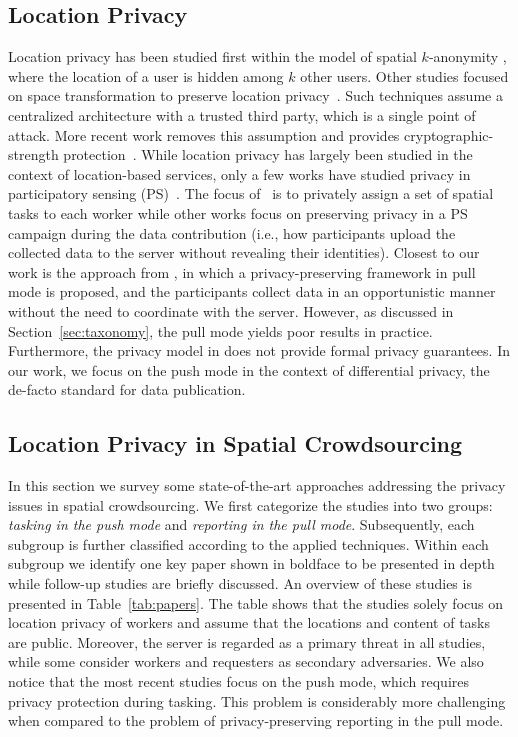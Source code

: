 \documentclass{USC-Thesis}
\numberwithin{equation}{chapter}
\begin{document}
\subsection{Location Privacy}
Location privacy has been studied first within the model of spatial $k$-anonymity \cite{gruteser2003anonymous,kido2005anonymous,mca06,gedik2008protecting,xue2009location,dewri2010query,palanisamy2011mobimix}, where the location of a user is hidden among $k$ other users. Other studies focused on space transformation to preserve location privacy~\cite{khoshgozaran2007blind,yiu2008spacetwist}.
Such techniques assume a centralized architecture with a trusted third party, which is a single point of attack. More recent work removes this assumption and provides cryptographic-strength protection~\cite{ghinita2008private}. While location privacy has largely been studied in the context of location-based services, only a few works have studied privacy in participatory sensing (PS)~\cite{kazemi2011towards,hu2010privacy,huang2009towards,cornelius2008anonysense}. The focus of~\cite{kazemi2011towards} is to privately assign a set of spatial tasks to each worker while other works \cite{hu2010privacy,huang2009towards} focus on preserving privacy in a PS campaign during the data contribution (i.e., how participants upload the collected data to the server without revealing their identities). Closest to our work is the approach from \cite{cornelius2008anonysense}, in which a privacy-preserving framework in pull mode is proposed, and the participants collect data in an opportunistic manner without the need to coordinate with the server. However, as discussed in Section~\ref{sec:taxonomy}, the pull mode yields poor results in practice. Furthermore, the privacy model in \cite{cornelius2008anonysense} does not provide formal privacy guarantees. In our work, we focus on the push mode in the context of differential privacy, the de-facto standard for data publication.

\subsection{Location Privacy in Spatial Crowdsourcing}

In this section we survey some state-of-the-art approaches addressing the privacy issues in spatial crowdsourcing. We first categorize the studies into two groups: \emph{tasking in the push mode} and \emph{reporting in the pull mode}. Subsequently, each subgroup is further classified according to the applied techniques. Within each subgroup we identify one key paper shown in boldface to be presented in depth while follow-up studies are briefly discussed. An overview of these studies is presented in Table~\ref{tab:papers}. The table shows that the studies solely focus on location privacy of workers and assume that the locations and content of tasks are public. Moreover, the server is regarded as a primary threat in all studies, while some consider workers and requesters as secondary adversaries. We also notice that the most recent studies focus on the push mode, which requires privacy protection during tasking. This problem is considerably more challenging when compared to the problem of privacy-preserving reporting in the pull mode.
\end{document}
